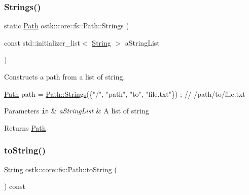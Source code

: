 \subsubsection{\texorpdfstring{Strings()}{Strings()}}
{\footnotesize\ttfamily static \hyperlink{classostk_1_1core_1_1fs_1_1_path}{Path} ostk\+::core\+::fs\+::\+Path\+::\+Strings (\begin{DoxyParamCaption}\item[{const std\+::initializer\+\_\+list$<$ \hyperlink{classostk_1_1core_1_1types_1_1_string}{String} $>$}]{a\+String\+List }\end{DoxyParamCaption})\hspace{0.3cm}{\ttfamily [static]}}



Constructs a path from a list of string. 


\begin{DoxyCode}
\hyperlink{classostk_1_1core_1_1fs_1_1_path_a1a5fff28594542489223b4cfad6cc9fb}{Path} path = \hyperlink{classostk_1_1core_1_1fs_1_1_path_a344d49d5962f0cdd908d898ed329224f}{Path::Strings}(\{\textcolor{stringliteral}{"/"}, \textcolor{stringliteral}{"path"}, \textcolor{stringliteral}{"to"}, \textcolor{stringliteral}{"file.txt"}\}) ; \textcolor{comment}{// /path/to/file.txt}
\end{DoxyCode}



\begin{DoxyParams}[1]{Parameters}
\mbox{\tt in}  & {\em a\+String\+List} & A list of string \\
\hline
\end{DoxyParams}
\begin{DoxyReturn}{Returns}
\hyperlink{classostk_1_1core_1_1fs_1_1_path}{Path} 
\end{DoxyReturn}
\mbox{\label{classostk_1_1core_1_1fs_1_1_path_a6153c19e534373b653c3f68b4750f970}} 
\subsubsection{\texorpdfstring{to\+String()}{toString()}}
{\footnotesize\ttfamily \hyperlink{classostk_1_1core_1_1types_1_1_string}{String} ostk\+::core\+::fs\+::\+Path\+::to\+String (\begin{DoxyParamCaption}{ }\end{DoxyParamCaption}) const}



